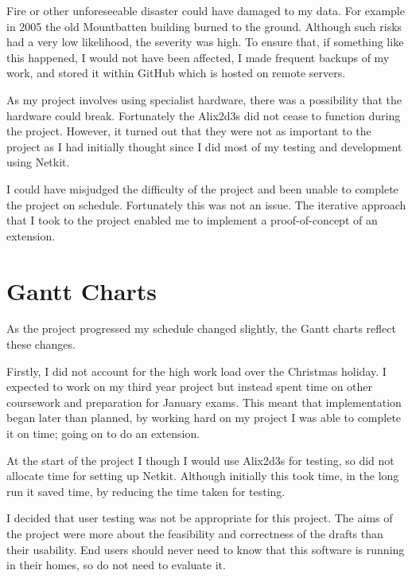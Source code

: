 Fire or other unforeseeable disaster could have damaged to my data. For example
in 2005 the old Mountbatten building burned to the ground. Although such risks
had a very low likelihood, the severity was high.  To ensure that, if something
like this happened, I would not have been affected, I made frequent backups of
my work, and stored it within GitHub which is hosted on remote servers.

As my project involves using specialist hardware, there was a possibility that
the hardware could break. Fortunately the Alix2d3s did not cease to function
during the project. However, it turned out that they were not as important to
the project as I had initially thought since I did most of my testing and
development using Netkit.

I could have misjudged the difficulty of the project and been unable to
complete the project on schedule. Fortunately this was not an issue. The
iterative approach that I took to the project enabled me to implement a
proof-of-concept of an extension.  

\section{Gantt Charts}
As the project progressed my schedule changed slightly, the Gantt charts
reflect these changes.

Firstly, I did not account for the high work load over the Christmas holiday. I
expected to work on my third year project but instead spent time on other
coursework and preparation for January exams. This meant that implementation
began later than planned, by working hard on my project I was able to complete
it on time; going on to do an extension. 

At the start of the project I though I would use Alix2d3s for testing, so
did not allocate time for setting up Netkit. Although initially this took time,
in the long run it saved time, by reducing the time taken for testing. 

I decided that user testing was not be appropriate for this project. The aims
of the project were more about the feasibility and correctness of the drafts
than their usability. End users should never need to know that this software is
running in their homes, so do not need to evaluate it. 

